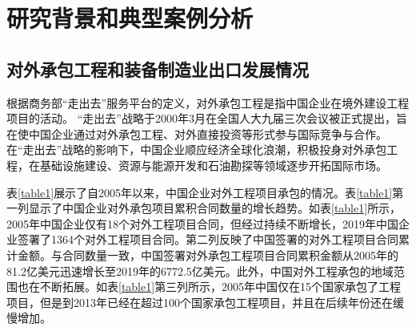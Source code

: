 \documentclass[a4paper,12pt]{article}
\begin{document}
\section{研究背景和典型案例分析}
\subsection{对外承包工程和装备制造业出口发展情况}
根据商务部“走出去”服务平台的定义，对外承包工程是指中国企业在境外建设工程项目的活动。 “走出去”战略于2000年3月在全国人大九届三次会议被正式提出，旨在使中国企业通过对外承包工程、对外直接投资等形式参与国际竞争与合作。在“走出去”战略的影响下，中国企业顺应经济全球化浪潮，积极投身对外承包工程，在基础设施建设、资源与能源开发和石油勘探等领域逐步开拓国际市场。

	\vspace{0.5em}  %
	
表\ref{table1}展示了自2005年以来，中国企业对外工程项目承包的情况。表\ref{table1}第一列显示了中国企业对外承包项目累积合同数量的增长趋势。如表\ref{table1}所示，2005年中国企业仅有18个对外工程项目合同，但经过持续不断增长，2019年中国企业签署了1364个对外工程项目合同。第二列反映了中国签署的对外工程项目合同累计金额。与合同数量一致，中国签署对外承包工程项目合同累积金额从2005年的81.2亿美元迅速增长至2019年的6772.5亿美元。此外，中国对外工程承包的地域范围也在不断拓展。如表\ref{table1}第三列所示，2005年中国仅在15个国家承包了工程项目，但是到2013年已经在超过100个国家承包工程项目，并且在后续年份还在缓慢增加。
\end{document}

